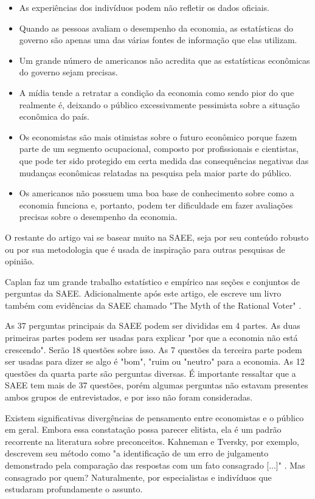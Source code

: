 \begin{itemize}
    \item As experiências dos indivíduos podem não refletir os dados oficiais.
    \item Quando as pessoas avaliam o desempenho da economia, as estatísticas do governo são apenas uma das várias fontes de informação que elas utilizam.
    \item Um grande número de americanos não acredita que as estatísticas econômicas do governo sejam precisas.
    \item A mídia tende a retratar a condição da economia como sendo pior do que realmente é, deixando o público excessivamente pessimista sobre a situação econômica do país.
    \item Os economistas são mais otimistas sobre o futuro econômico porque fazem parte de um segmento ocupacional, composto por profissionais e cientistas, que pode ter sido protegido em certa medida das consequências negativas das mudanças econômicas relatadas na pesquisa pela maior parte do público.
    \item Os americanos não possuem uma boa base de conhecimento sobre como a economia funciona e, portanto, podem ter dificuldade em fazer avaliações precisas sobre o desempenho da economia.
\end{itemize}

O restante do artigo vai se basear muito na SAEE, seja por seu conteúdo robusto ou por sua metodologia que é usada de inspiração para outras pesquisas de opinião.

Caplan faz um grande trabalho estatístico e empírico nas seções e conjuntos de perguntas da SAEE. Adicionalmente após este artigo, ele escreve um livro também com evidências da SAEE chamado "The Myth of the Rational Voter" \cite{The_Myth_of_the_Rational_Voter,Systematically_Biased_Beliefs_about_Economics}.

As 37 perguntas principais da SAEE podem ser divididas em 4 partes. As duas primeiras partes podem ser usadas para explicar "por que a economia não está crescendo". Serão 18 questões sobre isso. As 7 questões da terceira parte podem ser usadas para dizer se algo é "bom", "ruim ou "neutro" para a economia. As 12 questões da quarta parte são perguntas diversas. É importante ressaltar que a SAEE tem mais de 37 questões, porém algumas perguntas não estavam presentes ambos grupos de entrevistados, e por isso não foram consideradas.

Existem significativas divergências de pensamento entre economistas e o público em geral. Embora essa constatação possa parecer elitista, ela é um padrão recorrente na literatura sobre preconceitos. Kahneman e Tversky, por exemplo, descrevem seu método como "a identificação de um erro de julgamento demonstrado pela comparação das respostas com um fato consagrado [...]" \cite{Judgment_under_Uncertainty}. Mas consagrado por quem? Naturalmente, por especialistas e indivíduos que estudaram profundamente o assunto.

